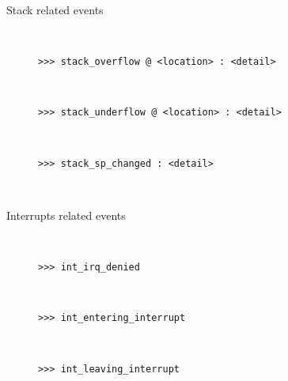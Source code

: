 \begin{description}
            \item[Stack related events]~\\
                \begin{description}
                    \item[\texttt{>{}>{}> stack\_overflow @ <location> : <detail>}]~\\
                    \item[\texttt{>{}>{}> stack\_underflow @ <location> : <detail>}]~\\
                    \item[\texttt{>{}>{}> stack\_sp\_changed : <detail>}]~\\
                \end{description}

            \item[Interrupts related events]~\\
                \begin{description}
                    \item[\texttt{>{}>{}> int\_irq\_denied}]~\\
                    \item[\texttt{>{}>{}> int\_entering\_interrupt}]~\\
                    \item[\texttt{>{}>{}> int\_leaving\_interrupt}]~\\
                \end{description}


\end{description}
